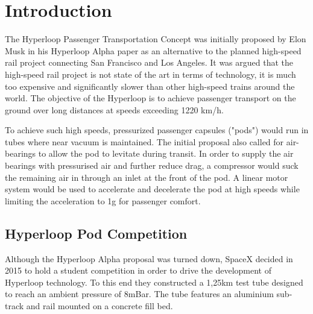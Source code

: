 
\chapter{Introduction}

The Hyperloop Passenger Transportation Concept was initially proposed by Elon Musk in his Hyperloop Alpha paper\cite{HyperloopAlpha} as an alternative to the planned high-speed rail project connecting San Francisco and Los Angeles. It was argued that the high-speed rail project is not state of the art in terms of technology, it is much too expensive and significantly slower than other high-speed trains around the world. The objective of the Hyperloop is to achieve passenger transport on the ground over long distances at speeds exceeding 1220 km/h.

To achieve such high speeds, pressurized passenger capsules ("pods") would run in tubes where near vacuum is maintained. The initial proposal also called for air-bearings to allow the pod to levitate during transit. In order to supply the air bearings with pressurised air and further reduce drag, a compressor would suck the remaining air in through an inlet at the front of the pod. A linear motor system would be used to accelerate and decelerate the pod at high speeds while limiting the acceleration to 1g for passenger comfort.

\section{Hyperloop Pod Competition}

Although the Hyperloop Alpha proposal was turned down, SpaceX decided in 2015 to hold a student competition\cite{HyperloopCompetiton} in order to drive the development of Hyperloop technology. To this end they constructed a 1,25km test tube designed to reach an ambient pressure of 8mBar. The tube features an aluminium sub-track and rail mounted on a concrete fill bed.


